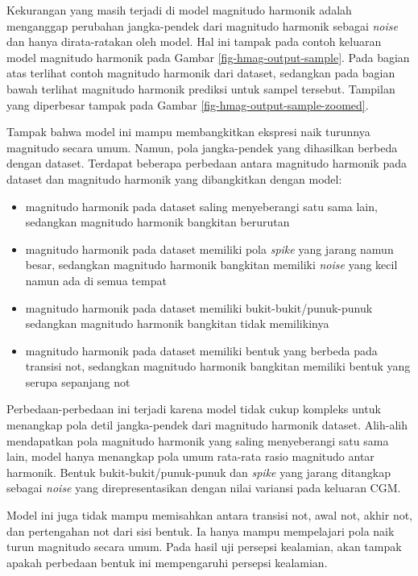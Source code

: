 Kekurangan yang masih terjadi di model magnitudo harmonik adalah menganggap perubahan jangka-pendek dari magnitudo harmonik sebagai \textit{noise} dan hanya dirata-ratakan oleh model. Hal ini tampak pada contoh keluaran model magnitudo harmonik pada Gambar \ref{fig-hmag-output-sample}. Pada bagian atas terlihat contoh magnitudo harmonik dari dataset, sedangkan pada bagian bawah terlihat magnitudo harmonik prediksi untuk sampel tersebut. Tampilan yang diperbesar tampak pada Gambar \ref{fig-hmag-output-sample-zoomed}.

Tampak bahwa model ini mampu membangkitkan ekspresi naik turunnya magnitudo secara umum. Namun, pola jangka-pendek yang dihasilkan berbeda dengan dataset. Terdapat beberapa perbedaan antara magnitudo harmonik pada dataset dan magnitudo harmonik yang dibangkitkan dengan model:

\begin{itemize}
	\item magnitudo harmonik pada dataset saling menyeberangi satu sama lain, sedangkan magnitudo harmonik bangkitan berurutan
	\item magnitudo harmonik pada dataset memiliki pola \textit{spike} yang jarang namun besar, sedangkan magnitudo harmonik bangkitan memiliki \textit{noise} yang kecil namun ada di semua tempat
	\item magnitudo harmonik pada dataset memiliki bukit-bukit/punuk-punuk sedangkan magnitudo harmonik bangkitan tidak memilikinya
	\item magnitudo harmonik pada dataset memiliki bentuk yang berbeda pada transisi not, sedangkan magnitudo harmonik bangkitan memiliki bentuk yang serupa sepanjang not
\end{itemize}

Perbedaan-perbedaan ini terjadi karena model tidak cukup kompleks untuk menangkap pola detil jangka-pendek dari magnitudo harmonik dataset. Alih-alih mendapatkan pola magnitudo harmonik yang saling menyeberangi satu sama lain, model hanya menangkap pola umum rata-rata rasio magnitudo antar harmonik. Bentuk bukit-bukit/punuk-punuk dan \textit{spike} yang jarang ditangkap sebagai \textit{noise} yang direpresentasikan dengan nilai variansi pada keluaran CGM.

Model ini juga tidak mampu memisahkan antara transisi not, awal not, akhir not, dan pertengahan not dari sisi bentuk. Ia hanya mampu mempelajari pola naik turun magnitudo secara umum. Pada hasil uji persepsi kealamian, akan tampak apakah perbedaan bentuk ini mempengaruhi persepsi kealamian.

